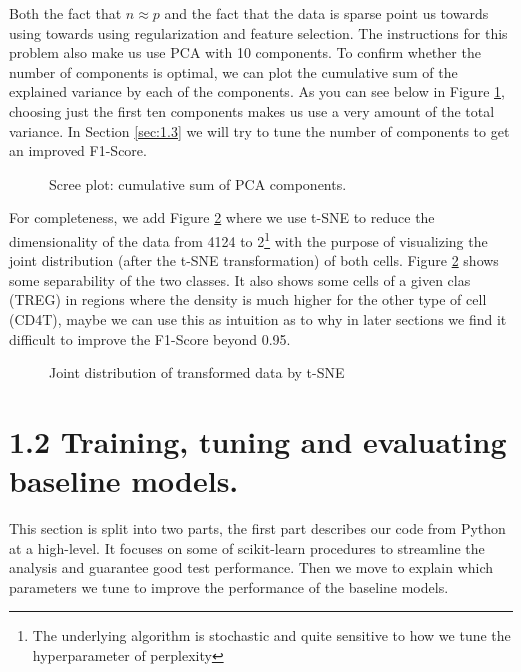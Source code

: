 \documentclass{article}
\begin{document}
Both the fact that $n \approx p$ and the fact that the data is sparse point us towards using towards using regularization and feature selection.
The instructions for this problem also make us use PCA with 10 components. To confirm whether the number of components is optimal, we can plot the cumulative sum of the explained variance by each of the components.
As you can see below in Figure \ref{fig:scree}, choosing just the first ten components makes us use a very amount of the total variance.
In Section \ref{sec:1.3} we will try to tune the number of components to get an improved F1-Score.

\begin{figure}[h]
    
    
    \caption{Scree plot: cumulative sum of PCA components.}\label{fig:scree}
\end{figure}

For completeness, we add Figure \ref{fig:tsne} where we use t-SNE to reduce the dimensionality of the data from 4124 to 2\footnote{ The underlying algorithm is stochastic 
and quite sensitive to how we tune the hyperparameter of perplexity} with the purpose of visualizing the joint distribution (after the t-SNE transformation) of both cells. 
Figure \ref{fig:tsne} shows some separability of the two classes. It also shows some cells of a given clas (TREG) in regions where the density is much higher for the other type of cell (CD4T), maybe we can use this as intuition as to why
in later sections we find it difficult to improve the F1-Score beyond 0.95.


\begin{figure}[h]
    
    
    \caption{Joint distribution of transformed data by t-SNE}\label{fig:tsne}
\end{figure}

\section{1.2 Training, tuning and evaluating baseline models.}
This section is split into two parts, the first part describes our code from Python at a high-level. It focuses on some of scikit-learn procedures to streamline the analysis 
and guarantee good test performance. Then we move to explain which parameters we tune to improve the performance of the baseline models.
\end{document}
